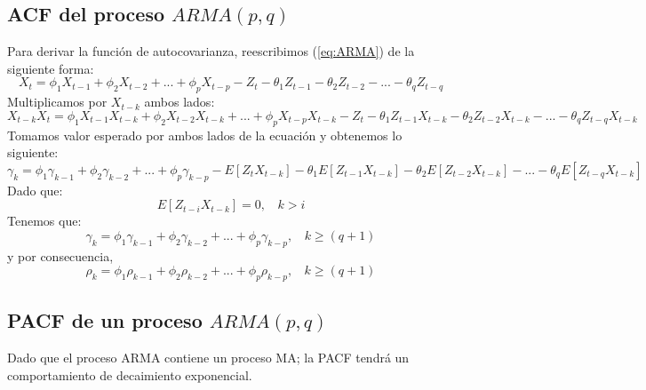 \documentclass[10pt,a4paper]{article}
\begin{document}
\subsection{ACF del proceso $ARMA(p,q)$}
Para derivar la función de autocovarianza, reescribimos (\ref{eq:ARMA}) de la siguiente forma:
\begin{equation}
	X_t = \phi_1 X_{t-1}+ \phi_2 X_{t-2} + ... + \phi_p X_{t-p}-Z_t-\theta_1 Z_{t-1} -\theta_2 Z_{t-2}-...-\theta_qZ_{t-q} 
\end{equation}
Multiplicamos por $X_{t-k}$ ambos lados:
\begin{equation}
	X_{t-k}X_t = \phi_1 X_{t-1}X_{t-k}+ \phi_2 X_{t-2}X_{t-k} + ... + \phi_p X_{t-p}X_{t-k}-Z_t-\theta_1 Z_{t-1}X_{t-k} -\theta_2 Z_{t-2}X_{t-k}-...-\theta_qZ_{t-q}X_{t-k} 
\end{equation}
Tomamos valor esperado por ambos lados de la ecuación y obtenemos lo siguiente:
\begin{equation}
	\gamma_k= \phi_1 \gamma_{k-1}+ \phi_2 \gamma_{k-2} + ... + \phi_p \gamma_{k-p}-E[Z_tX_{t-k}]-\theta_1 E[Z_{t-1}X_{t-k}] -\theta_2 E[Z_{t-2}X_{t-k}]-...-\theta_qE[Z_{t-q}X_{t-k}] 
\end{equation}
Dado que:
\begin{equation}
E[Z_{t-i}X_{t-k}] = 0 , \ \ \ \ k > i
\end{equation}
Tenemos que:
\begin{equation}
	\gamma_k= \phi_1 \gamma_{k-1}+ \phi_2 \gamma_{k-2} + ... + \phi_p \gamma_{k-p} , \ \ \ \ k \geq (q+1)
\end{equation}
y por consecuencia,
\begin{equation}
	\rho_k= \phi_1 \rho_{k-1}+ \phi_2 \rho_{k-2} + ... + \phi_p \rho_{k-p} , \ \ \ \ k \geq (q+1)
\end{equation}

\subsection{PACF de un proceso $ARMA(p,q)$}
Dado que el proceso ARMA contiene un proceso MA; la PACF tendrá un comportamiento de decaimiento exponencial.
\end{document}
